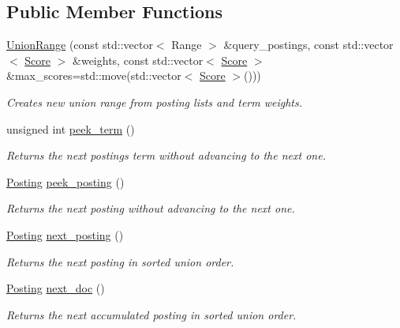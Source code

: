 \subsection*{Public Member Functions}
\begin{DoxyCompactItemize}
\item 
\hyperlink{classirkit_1_1UnionRange_a23072335eaa144321314fbbdd39e9423}{Union\+Range} (const std\+::vector$<$ Range $>$ \&query\+\_\+postings, const std\+::vector$<$ \hyperlink{classirkit_1_1UnionRange_a47fb098a85581f5e33f4203e16245dae}{Score} $>$ \&weights, const std\+::vector$<$ \hyperlink{classirkit_1_1UnionRange_a47fb098a85581f5e33f4203e16245dae}{Score} $>$ \&max\+\_\+scores=std\+::move(std\+::vector$<$ \hyperlink{classirkit_1_1UnionRange_a47fb098a85581f5e33f4203e16245dae}{Score} $>$()))
\begin{DoxyCompactList}\small\item\em Creates new union range from posting lists and term weights. \end{DoxyCompactList}\item 
unsigned int \hyperlink{classirkit_1_1UnionRange_aa985f4985486d3df259be0c932340f18}{peek\+\_\+term} ()
\begin{DoxyCompactList}\small\item\em Returns the next posting\textquotesingle{}s term without advancing to the next one. \end{DoxyCompactList}\item 
\hyperlink{classirkit_1_1UnionRange_a5f694970419f5a60d7fd41d740556229}{Posting} \hyperlink{classirkit_1_1UnionRange_a5c2f9a6ec77c812febdf1778e4b9b3f6}{peek\+\_\+posting} ()
\begin{DoxyCompactList}\small\item\em Returns the next posting without advancing to the next one. \end{DoxyCompactList}\item 
\hyperlink{classirkit_1_1UnionRange_a5f694970419f5a60d7fd41d740556229}{Posting} \hyperlink{classirkit_1_1UnionRange_aedb2ab6f4a5f0b9f57cf2c55214ed42e}{next\+\_\+posting} ()
\begin{DoxyCompactList}\small\item\em Returns the next posting in sorted union order. \end{DoxyCompactList}\item 
\hyperlink{classirkit_1_1UnionRange_a5f694970419f5a60d7fd41d740556229}{Posting} \hyperlink{classirkit_1_1UnionRange_a9161a468e74df4e76cd04104763f7d97}{next\+\_\+doc} ()
\begin{DoxyCompactList}\small\item\em Returns the next {\itshape accumulated posting} in sorted union order. \end{DoxyCompactList}\item 

\end{DoxyCompactItemize}
